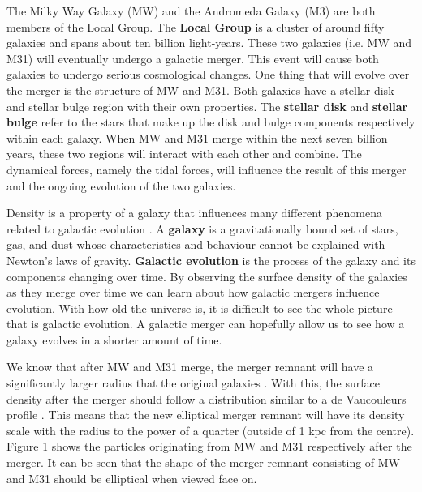 \documentclass[linenumbers,trackchanges]{aastex7}
\begin{document}
The Milky Way Galaxy (MW) and the Andromeda Galaxy (M3) are both
members of the Local Group. The \textbf{Local Group} is a cluster of
around fifty galaxies and spans about ten billion light-years. These
two galaxies (i.e. MW and M31) will eventually undergo a galactic
merger. This event will cause both galaxies to undergo serious 
cosmological changes. One thing that will evolve over the merger
is the structure of MW and M31. Both galaxies have a stellar disk and
stellar bulge region with their own properties. The \textbf{stellar
disk} and \textbf{stellar bulge} refer to the stars that make up the
disk and bulge components respectively within each galaxy. When MW and
M31 merge within the next seven billion years, these two regions will
interact with each other and combine. The dynamical forces, namely the
tidal forces, will influence the result of this merger and the ongoing
evolution of the two galaxies.

Density is a property of a galaxy that influences many different
phenomena related to galactic evolution
\citep{Torrey_Cox_Kewley_Hernquist_2012}. A \textbf{galaxy} is a
gravitationally bound set of stars, gas, and dust whose
characteristics and behaviour cannot be explained with Newton's laws
of gravity. \textbf{Galactic evolution} is the process of the galaxy
and its components changing over time. By observing the surface
density of the galaxies as they merge over time we can learn about how
galactic mergers influence evolution. With how old the universe is, it
is difficult to see the whole picture that is galactic evolution. A
galactic merger can hopefully allow us to see how a galaxy evolves in
a shorter amount of time.

We know that after MW and M31 merge, the merger remnant will have a
significantly larger radius that the original galaxies
\citep{van_der_Marel_Besla_Cox_Sohn_Anderson_2012}. With this, the
surface density after the merger should follow a distribution similar
to a de Vaucouleurs profile \citep{Brooks_Christensen_2016}. This
means that the new elliptical merger remnant will have its density
scale with the radius to the power of a quarter (outside of 1 kpc from
the centre). Figure 1 shows the particles originating from MW and M31
respectively after the merger. It can be seen that the shape of the
merger remnant consisting of MW and M31 should be elliptical when
viewed face on.
\end{document}
